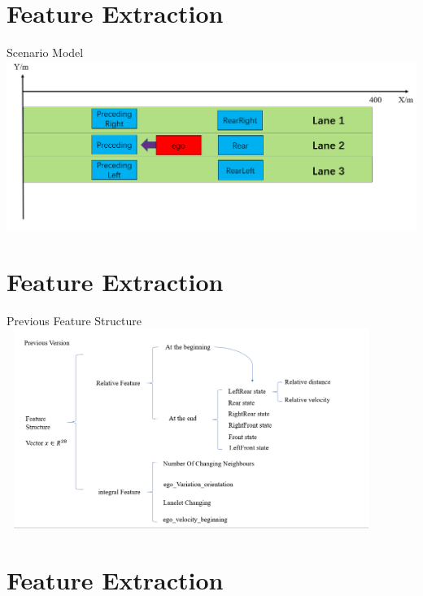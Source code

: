 \documentclass[shortpres]{beamer}
\begin{document}
\section{Feature Extraction}

\begin{frame}{Scenario Model}
    \includegraphics[height=0.6\textheight]{fig_FeatureExtraction/ScenarioModel.png}
\end{frame}

\section{Feature Extraction}

\begin{frame}{Previous Feature Structure}
    \includegraphics[width=12cm,height=6.5cm]{fig_FeatureExtraction/PreviousVersion.png}
\end{frame}

\section{Feature Extraction}
\end{document}
